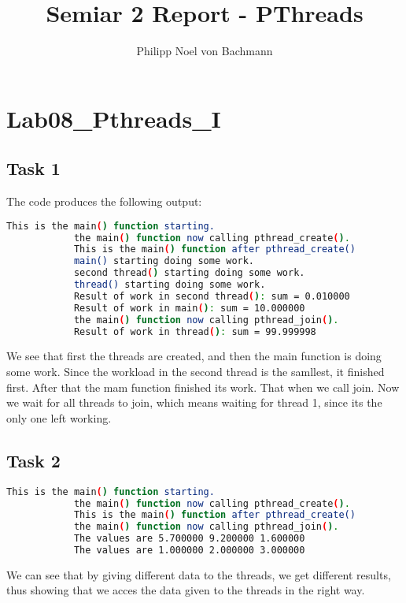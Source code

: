 \documentclass[a4paper]{scrartcl}
\title{Semiar 2 Report - PThreads}
\author{Philipp Noel von Bachmann}
\begin{document}
\maketitle
\section{Lab08\_Pthreads\_I}
    \subsection{Task 1}
        The code produces the following output:\\
        \begin{lstlisting}[language=bash]
            This is the main() function starting.
            the main() function now calling pthread_create().
            This is the main() function after pthread_create()
            main() starting doing some work.
            second thread() starting doing some work.
            thread() starting doing some work.
            Result of work in second thread(): sum = 0.010000
            Result of work in main(): sum = 10.000000
            the main() function now calling pthread_join().
            Result of work in thread(): sum = 99.999998
        \end{lstlisting}
        We see that first the threads are created, and then the main function is
        doing some work. Since the workload in the second thread is the
        samllest, it finished first. After that the mam function finished its
        work. That when we call join. Now we wait for all threads to join, which
        means waiting for thread 1, since its the only one left working.

    \subsection{Task 2}
        \begin{lstlisting}[language=bash]
            This is the main() function starting. 
            the main() function now calling pthread_create(). 
            This is the main() function after pthread_create()
            the main() function now calling pthread_join().
            The values are 5.700000 9.200000 1.600000 
            The values are 1.000000 2.000000 3.000000 
        \end{lstlisting}
        We can see that by giving different data to the threads, we get
        different results, thus showing that we acces the data given to the
        threads in the right way.
\end{document}

